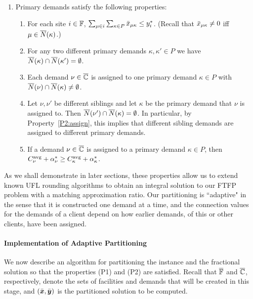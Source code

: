 \documentclass[11pt]{article}
\begin{document}
\begin{enumerate}
\item Primary demands satisfy the following properties:
%
\begin{enumerate}
%
\item \label{P2:yi} For each site $i\in\mathbb{F}$, $ \sum_{\mu\in i}\sum_{\kappa\in P}{\bar x}_{\mu\kappa} \leq y_i^\ast$.
	(Recall that ${\bar x}_{\mu\kappa}\neq 0$ iff $\mu\in {\overline{N}}(\kappa)$.)
%
	\item\label{P2:disjoint}  For any two different primary demands $\kappa,\kappa'\in P$ we have
	${\overline{N}}(\kappa)\cap {\overline{N}}(\kappa') = \emptyset$.
%
	\item \label{P2:assign} Each demand $\nu\in\overline{\mathbb{C}}$ is assigned
        to one primary demand $\kappa\in P$ with  ${\overline{N}}(\nu) \cap {\overline{N}}(\kappa) \neq \emptyset$.
%
      \item \label{P2:diff} 
Let $\nu,\nu'$ be different siblings and let $\kappa$ be the primary demand that $\nu$ is assigned to.
Then ${\overline{N}}(\nu')\cap {\overline{N}}(\kappa) = \emptyset$. In particular, by Property~\ref{P2:assign},
this implies that different sibling demands are assigned to different primary demands.
%
      \item \label{P2:cost} If a demand $\nu\in\overline{\mathbb{C}}$
        is assigned to a primary demand $\kappa\in P$, then
        $C^{{\mbox{\scriptsize\rm avg}}}_{\nu}+\alpha_{\nu}^\ast \geq
        C^{{\mbox{\scriptsize\rm avg}}}_{\kappa}+\alpha_{\kappa}^\ast$.
\end{enumerate}

\end{enumerate}

As we shall demonstrate in later sections, these properties
allow us to extend known UFL rounding algorithms to obtain
an integral solution to our FTFP problem with a matching
approximation ratio. Our partitioning is ``adaptive" in the
sense that it is constructed one demand at a time, and the
connection values for the demands of a client depend on how
earlier demands, of this or other clients, have been
assigned.


\paragraph{Implementation of Adaptive Partitioning}
We now describe an algorithm for partitioning the instance
and the fractional solution so that the properties (P1) and
(P2) are satisfied.  Recall that $\overline{\mathbb{F}}$ and $\overline{\mathbb{C}}$,
respectively, denote the sets of facilities and demands that will be
created in this stage, and $(\bar{\boldsymbol{x}},\bar{\boldsymbol{y}})$ is the partitioned
solution to be computed.
\end{document}
